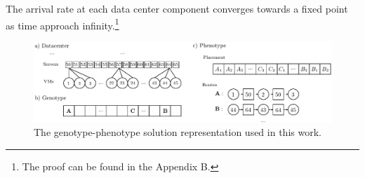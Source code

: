 \begin{lemma}
The arrival rate at each data center component converges towards a fixed point as time approach infinity.\footnote{The proof can be found in the Appendix B.}
\label{lemma:arrival_rate}
\end{lemma}

\begin{figure}[t!]
	\centering
	\includegraphics[width=\linewidth]{figures/solution_representation-crop}
	\caption{The genotype-phenotype solution representation used in this work.}
	\label{fig:gp_mapping}
\end{figure}


